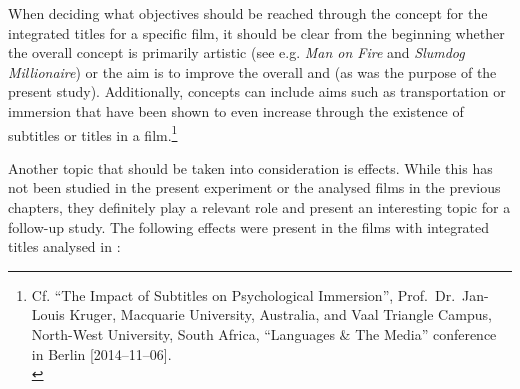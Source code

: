 When deciding what objectives should be reached through the concept for the integrated titles for a specific film, it should be clear from the beginning whether the overall concept is primarily artistic (see e.g. \textit{Man on Fire} and \textit{Slumdog Millionaire}) or the aim is to improve the overall  and  (as was the purpose of the present study). Additionally, concepts can include aims such as transportation or immersion that have been shown to even increase through the existence of subtitles or titles in a film.\footnote{Cf. “The Impact of Subtitles on Psychological Immersion”, Prof.~Dr.~Jan-Louis Kruger, Macquarie University, Australia, and Vaal Triangle Campus, North-West University, South Africa, “Languages \& The Media” conference in Berlin [2014--11--06].\\
}

Another topic that should be taken into consideration is effects. While this has not been studied in the present experiment or the analysed films in the previous chapters, they definitely play a relevant role and present an interesting topic for a follow-up study. The following effects were present in the films with integrated titles analysed in :

